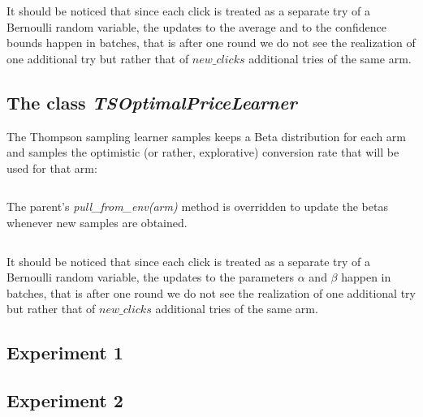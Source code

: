 \documentclass[11pt]{article} %
\begin{document}
It should be noticed that since each click is treated as a separate try of a Bernoulli random variable, the updates to the average and to the confidence bounds happen in batches, that is after one round we do not see the realization of one additional try but rather that of $new\_clicks$ additional tries of the same arm.\\

\begin{samepage}
\subsection{The class \textit{TSOptimalPriceLearner}}
The Thompson sampling learner samples keeps a Beta distribution for each arm and samples the optimistic (or rather, explorative) conversion rate that will be used for that arm:
\inputminted{python}{code/step3_ts_cr.py}
\end{samepage}
The parent's \textit{pull\_from\_env(arm)} method is overridden to update the betas whenever new samples are obtained.
\inputminted{python}{code/step3_ts_betas.py}
It should be noticed that since each click is treated as a separate try of a Bernoulli random variable, the updates to the parameters $\alpha$ and $\beta$ happen in batches, that is after one round we do not see the realization of one additional try but rather that of $new\_clicks$ additional tries of the same arm.

\clearpage
\subsection{Experiment 1}

\clearpage


\clearpage
\subsection{Experiment 2}

\clearpage


\clearpage
\end{document}
